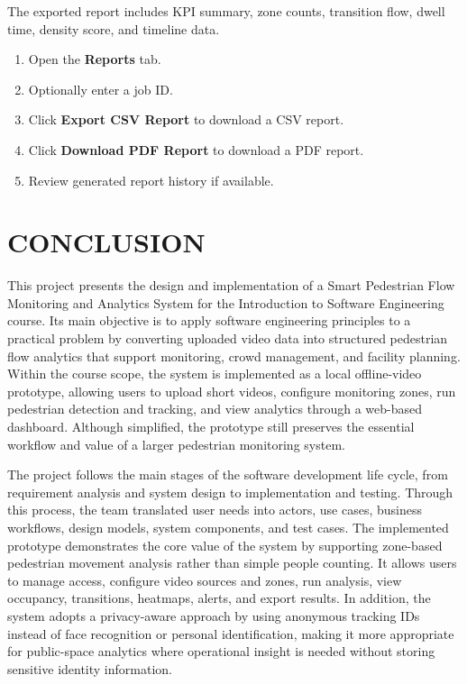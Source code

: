 \documentclass[12pt,a4paper]{report}
\begin{document}
The exported report includes KPI summary, zone counts, transition flow, dwell time, density score, and timeline data.

\begin{enumerate}
    \item Open the \textbf{Reports} tab.
    \item Optionally enter a job ID.
    \item Click \textbf{Export CSV Report} to download a CSV report.
    \item Click \textbf{Download PDF Report} to download a PDF report.
    \item Review generated report history if available.
\end{enumerate}

\chapter*{CONCLUSION}

This project presents the design and implementation of a Smart Pedestrian Flow Monitoring and Analytics System for the Introduction to Software Engineering course. Its main objective is to apply software engineering principles to a practical problem by converting uploaded video data into structured pedestrian flow analytics that support monitoring, crowd management, and facility planning. Within the course scope, the system is implemented as a local offline-video prototype, allowing users to upload short videos, configure monitoring zones, run pedestrian detection and tracking, and view analytics through a web-based dashboard. Although simplified, the prototype still preserves the essential workflow and value of a larger pedestrian monitoring system.

The project follows the main stages of the software development life cycle, from requirement analysis and system design to implementation and testing. Through this process, the team translated user needs into actors, use cases, business workflows, design models, system components, and test cases. The implemented prototype demonstrates the core value of the system by supporting zone-based pedestrian movement analysis rather than simple people counting. It allows users to manage access, configure video sources and zones, run analysis, view occupancy, transitions, heatmaps, alerts, and export results. In addition, the system adopts a privacy-aware approach by using anonymous tracking IDs instead of face recognition or personal identification, making it more appropriate for public-space analytics where operational insight is needed without storing sensitive identity information.
\end{document}
